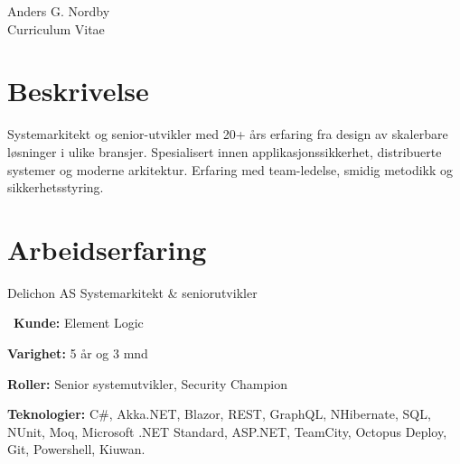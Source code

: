 \documentclass[10pt]{article} %
\begin{document}
\begin{paracol}{2} %


\parbox[top][0.12\textheight][c]{\linewidth}{ %
	\vspace{-0.04\textheight} %
	\centering %
	{\sffamily\Huge Anders G. Nordby}\\\medskip %
	{\Huge\color{headings}\cvtextfont Curriculum Vitae}
}


\section{Beskrivelse}

Systemarkitekt og senior-utvikler med 20+ års erfaring fra design av skalerbare løsninger i ulike bransjer. Spesialisert innen applikasjonssikkerhet, distribuerte systemer og moderne arkitektur. Erfaring med team-ledelse, smidig metodikk og sikkerhetsstyring.


\section{Arbeidserfaring} 

{}
{Delichon AS} 
{Systemarkitekt \& seniorutvikler} 
{\
\textbf{Kunde:} Element Logic

\textbf{Varighet:} 5 år og 3 mnd

\textbf{Roller:} Senior systemutvikler, Security Champion

\textbf{Teknologier:} C\#, Akka.NET, Blazor, REST, GraphQL, NHibernate, SQL, NUnit, Moq, Microsoft .NET Standard, ASP.NET, TeamCity, Octopus Deploy, Git, Powershell, Kiuwan.
 
}
\end{paracol}
\end{document}
